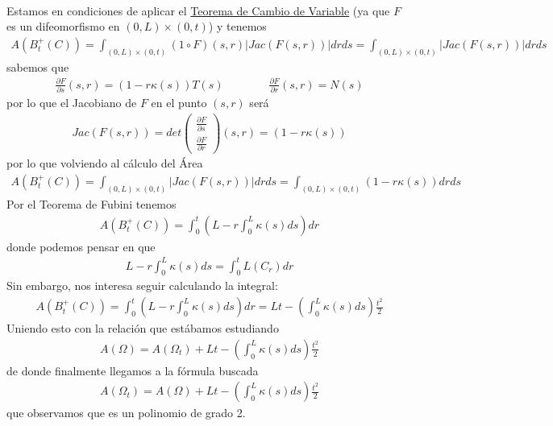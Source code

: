 \begin{ejercicio}
\begin{solucion}
\begin{gather*}
        \end{gather*}
        Estamos en condiciones de aplicar el \hyperref[teo:cambio_variable]{Teorema de Cambio de Variable} (ya que $F$ es un difeomorfismo en $(0,L)\times (0,t)$) y tenemos
        \begin{gather*}
            A(B_t^+(C)) = \int_{(0,L)\times (0,t)} (1 \circ F)(s,r) |Jac(F(s,r))|drds = \int_{(0,L)\times (0,t)} |Jac(F(s,r))|drds
        \end{gather*}
        sabemos que 
        \begin{gather*}
            \frac{\partial F}{\partial s}(s,r) = (1-r\kappa(s))T(s) \qquad \qquad \frac{\partial F}{\partial r}(s,r) = N(s)
        \end{gather*}
        por lo que el Jacobiano de $F$ en el punto $(s,r)$ será 
        \begin{gather*}
            Jac(F(s,r)) = det 
            \begin{pmatrix}
                \frac{\partial F}{\partial s} \\[1em] \frac{\partial F}{\partial r}
            \end{pmatrix}
            (s,r) = (1-r\kappa(s))
        \end{gather*}
        por lo que volviendo al cálculo del Área
        \begin{gather*}
            A(B_t^+(C)) = \int_{(0,L)\times (0,t)} |Jac(F(s,r))|drds = \int_{(0,L)\times (0,t)} (1-r\kappa(s)) drds 
        \end{gather*}
        Por el Teorema de Fubini tenemos
        \begin{gather*}
            A(B_t^+(C)) = \int_0^t \left(L-r \int_0^L \kappa(s) ds\right) dr
        \end{gather*}
        donde podemos pensar en que
        \begin{gather*}
            L-r \int_0^L \kappa(s) ds = \int_0^t L(C_r)dr
        \end{gather*}
        Sin embargo, nos interesa seguir calculando la integral:
        \begin{gather*}
            A(B_t^+(C)) = \int_0^t \left(L-r \int_0^L \kappa(s) ds\right) dr = Lt - (\int_0^L \kappa(s)ds) \frac{t^2}{2}
        \end{gather*}
        Uniendo esto con la relación que estábamos estudiando
        \begin{gather*}
            A(\Omega) = A(\Omega_t) + Lt - \left(\int_0^L \kappa(s)ds\right) \frac{t^2}{2}
        \end{gather*}
        de donde finalmente llegamos a la fórmula buscada
        \begin{gather*}
            \boxed{A(\Omega_t) = A(\Omega) + Lt - \left(\int_0^L \kappa(s)ds\right) \frac{t^2}{2}}
        \end{gather*}
        que observamos que es un polinomio de grado 2.
    \end{solucion}
\end{ejercicio}

